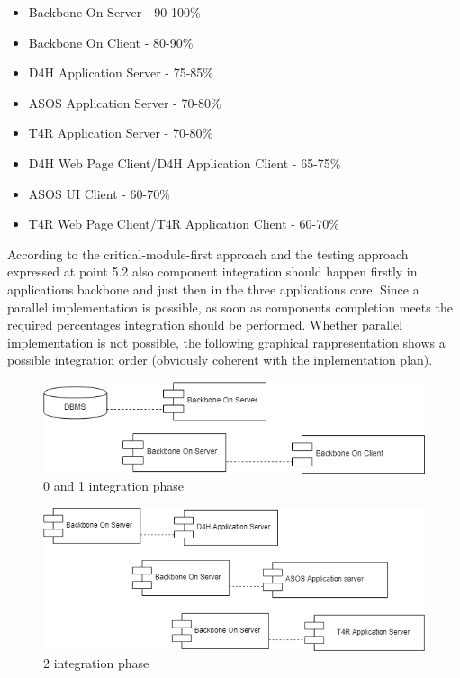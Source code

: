 \begin{itemize}
\item Backbone On Server - 90-100\%
\item Backbone On Client - 80-90\%
\item D4H Application Server - 75-85\% 
\item ASOS Application Server - 70-80\%
\item T4R Application Server - 70-80\%
\item D4H Web Page Client/D4H Application Client - 65-75\%
\item ASOS UI Client - 60-70\%
\item T4R Web Page Client/T4R Application Client - 60-70\%
\end{itemize}
According to the critical-module-first approach and the testing approach expressed at point 5.2 also component integration should happen firstly in applications backbone and just then in the three applications core. Since a parallel implementation is possible, as soon as components completion meets the required percentages integration should be performed. Whether parallel implementation is not possible, the following graphical rappresentation shows a possible integration order (obviously coherent with the inplementation plan). 
\begin{figure}[H]
\caption{0 and 1 integration phase}
\includegraphics[width = \textwidth]{sections/implementationIntegrationTestGraphs/IntegrationOrder0-1phase.png}
\end{figure}
\begin{figure}[H]
\caption{2 integration phase}
\includegraphics[width = \textwidth]{sections/implementationIntegrationTestGraphs/IntegrationOrder2phase.png}
\end{figure}
